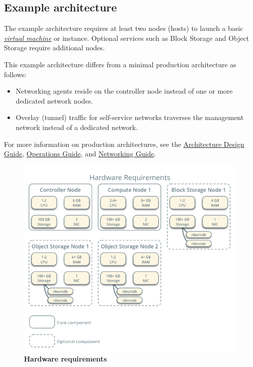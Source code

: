 \documentclass[letterpaper,10pt,english]{sphinxmanual}
\begin{document}
\subsection{Example architecture}
\label{_source/installation_guide/overview:overview-example-architectures}\label{_source/installation_guide/overview:example-architecture}
The example architecture requires at least two nodes (hosts) to launch a basic
{\hyperref[_source/glossary:term-virtual-machine-vm]{\emph{virtual machine}}} or instance. Optional
services such as Block Storage and Object Storage require additional nodes.

This example architecture differs from a minimal production architecture as
follows:
\begin{itemize}
\item {} 
Networking agents reside on the controller node instead of one or more
dedicated network nodes.

\item {} 
Overlay (tunnel) traffic for self-service networks traverses the management
network instead of a dedicated network.

\end{itemize}

For more information on production architectures, see the
\href{http://docs.openstack.org/arch-design/}{Architecture Design Guide},
\href{http://docs.openstack.org/ops/}{Operations Guide}, and
\href{http://docs.openstack.org/mitaka/networking-guide/}{Networking Guide}.
\begin{figure}[htbp]
\centering
\capstart

\includegraphics{hwreqs.png}
\caption{\textbf{Hardware requirements}}\label{_source/installation_guide/overview:figure-hwreqs}\end{figure}
\end{document}
